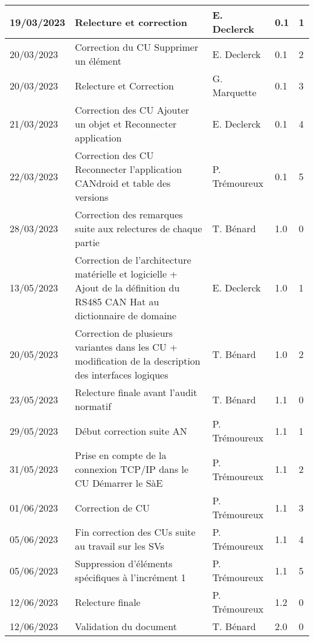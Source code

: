 \begin{longtable}[l]{|p{2cm}|p{6cm}|p{2.5cm}|p{1.5cm}|p{1.7cm}|}
    \hline
        19/03/2023 & Relecture et correction & E. Declerck & 0.1 & 1\\
    \hline
        20/03/2023 & Correction du CU Supprimer un élément & E. Declerck & 0.1 & 2\\
    \hline
        20/03/2023 & Relecture et Correction & G. Marquette & 0.1 & 3 \\
    \hline
        21/03/2023 & Correction des CU Ajouter un objet et Reconnecter application & E. Declerck & 0.1 & 4\\
    \hline
        22/03/2023 & Correction des CU Reconnecter l'application CANdroid et table des versions & P. Trémoureux & 0.1 & 5\\
    \hline
        28/03/2023 & Correction des remarques suite aux relectures de chaque partie & T. Bénard & 1.0 & 0\\
    \hline
        13/05/2023 & Correction de l'architecture matérielle et logicielle + Ajout de la définition du RS485 CAN Hat au dictionnaire de domaine & E. Declerck & 1.0 & 1\\
    \hline
        20/05/2023 & Correction de plusieurs variantes dans les CU + modification de la description des interfaces logiques & T. Bénard & 1.0 & 2\\
    \hline
        23/05/2023 & Relecture finale avant l'audit normatif & T. Bénard & 1.1 & 0\\
    \hline
        29/05/2023 & Début correction suite AN & P. Trémoureux & 1.1 & 1\\
    \hline
        31/05/2023 & Prise en compte de la connexion TCP/IP dans le CU Démarrer le SàE & P. Trémoureux & 1.1 & 2\\
    \hline
        01/06/2023 & Correction de CU & P. Trémoureux & 1.1 & 3\\
    \hline
        05/06/2023 & Fin correction des CUs suite au travail sur les SVs & P. Trémoureux & 1.1 & 4\\
    \hline
        05/06/2023 & Suppression d'éléments spécifiques à l'incrément 1 & P. Trémoureux & 1.1 & 5\\
    \hline
        12/06/2023 & Relecture finale & P. Trémoureux & 1.2 & 0\\
    \hline
        12/06/2023 & Validation du document & T. Bénard & 2.0 & 0\\
    \hline
\end{longtable}


\newpage %